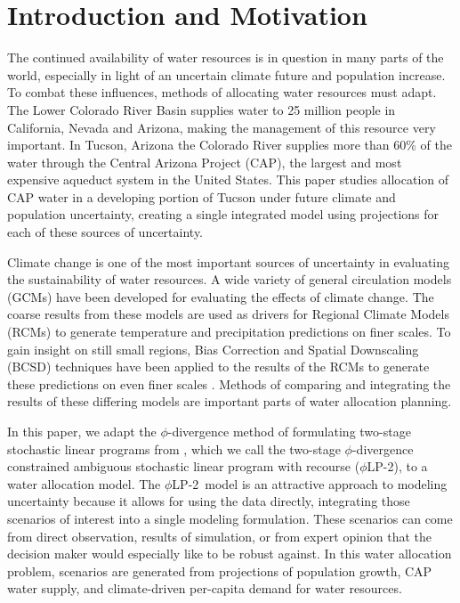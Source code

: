 \documentclass[opre,nonblindrev]{informs3} %
\newcommand{\plp}{$\phi$LP-2}
\begin{document}
\section{Introduction and Motivation}

The continued availability of water resources is in question in many parts of the world, especially in light of an uncertain climate future and population increase.
To combat these influences, methods of allocating water resources must adapt.
The Lower Colorado River Basin supplies water to 25 million people in California, Nevada and Arizona, making the management of this resource very important.
In Tucson, Arizona the Colorado River supplies more than 60\% of the water through the Central Arizona Project (CAP), the largest and most expensive aqueduct system in the United States.
This paper studies allocation of CAP water in a developing portion of Tucson under future climate and population uncertainty, creating a single integrated model using projections for each of these sources of uncertainty.

Climate change is one of the most important sources of uncertainty in evaluating the sustainability of water resources.
A wide variety of general circulation models (GCMs) have been developed for evaluating the effects of climate change.
The coarse results from these models are used as drivers for Regional Climate Models (RCMs) to generate temperature and precipitation predictions on finer scales.
To gain insight on still small regions, Bias Correction and Spatial Downscaling (BCSD) techniques have been applied to the results of the RCMs to generate these predictions on even finer scales \citep{bcsdreclamation}.
Methods of comparing and integrating the results of these differing models are important parts of water allocation planning.

In this paper, we adapt the $\phi$-divergence method of formulating two-stage stochastic linear programs from \cite{love2013phi}, which we call the two-stage $\phi$-divergence constrained ambiguous stochastic linear program with recourse (\plp), to a water allocation model.
The \plp\ model is an attractive approach to modeling uncertainty because it allows for using the data directly, integrating those scenarios of interest into a single modeling formulation.
These scenarios can come from direct observation, results of simulation, or from expert opinion that the decision maker would especially like to be robust against.
In this water allocation problem, scenarios are generated from projections of population growth, CAP water supply, and climate-driven per-capita demand for water resources.
\end{document}
